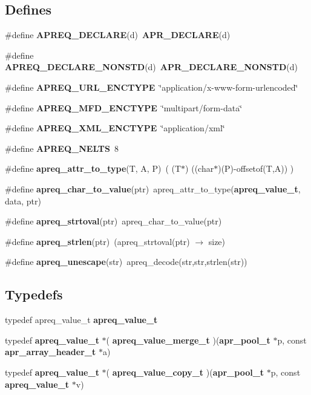 \subsection*{Defines}
\begin{CompactItemize}
\item 
\#define {\bf APREQ\_\-DECLARE}(d)\ {\bf APR\_\-DECLARE}(d)\label{apreq_8h_a23}

\item 
\#define {\bf APREQ\_\-DECLARE\_\-NONSTD}(d)\ {\bf APR\_\-DECLARE\_\-NONSTD}(d)\label{apreq_8h_a24}

\item 
\#define {\bf APREQ\_\-URL\_\-ENCTYPE}\ \char`\"{}application/x-www-form-urlencoded\char`\"{}\label{apreq_8h_a25}

\item 
\#define {\bf APREQ\_\-MFD\_\-ENCTYPE}\ \char`\"{}multipart/form-data\char`\"{}\label{apreq_8h_a26}

\item 
\#define {\bf APREQ\_\-XML\_\-ENCTYPE}\ \char`\"{}application/xml\char`\"{}\label{apreq_8h_a27}

\item 
\#define {\bf APREQ\_\-NELTS}\ 8\label{apreq_8h_a28}

\item 
\#define {\bf apreq\_\-attr\_\-to\_\-type}(T, A, P)\ ( (T$\ast$) ((char$\ast$)(P)-offsetof(T,A)) )\label{apreq_8h_a29}

\item 
\#define {\bf apreq\_\-char\_\-to\_\-value}(ptr)\ apreq\_\-attr\_\-to\_\-type({\bf apreq\_\-value\_\-t}, data, ptr)\label{apreq_8h_a30}

\item 
\#define {\bf apreq\_\-strtoval}(ptr)\ apreq\_\-char\_\-to\_\-value(ptr)\label{apreq_8h_a31}

\item 
\#define {\bf apreq\_\-strlen}(ptr)\ (apreq\_\-strtoval(ptr) $\rightarrow$ size)\label{apreq_8h_a32}

\item 
\#define {\bf apreq\_\-unescape}(str)\ apreq\_\-decode(str,str,strlen(str))\label{apreq_8h_a33}

\end{CompactItemize}
\subsection*{Typedefs}
\begin{CompactItemize}
\item 
typedef apreq\_\-value\_\-t {\bf apreq\_\-value\_\-t}
\item 
typedef {\bf apreq\_\-value\_\-t} $\ast$( {\bf apreq\_\-value\_\-merge\_\-t} )({\bf apr\_\-pool\_\-t} $\ast$p, const {\bf apr\_\-array\_\-header\_\-t} $\ast$a)\label{apreq_8h_a1}

\item 
typedef {\bf apreq\_\-value\_\-t} $\ast$( {\bf apreq\_\-value\_\-copy\_\-t} )({\bf apr\_\-pool\_\-t} $\ast$p, const {\bf apreq\_\-value\_\-t} $\ast$v)\label{apreq_8h_a2}

\end{CompactItemize}
